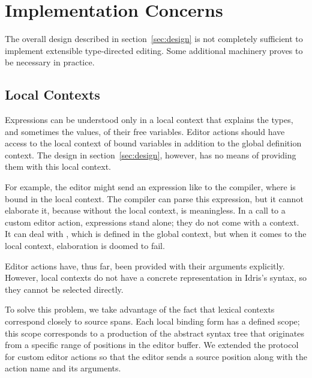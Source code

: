 \section{Implementation Concerns}\label{sec:implementation}


The overall design described in section~\ref{sec:design} is not
completely sufficient to implement extensible type-directed
editing. Some additional machinery proves to be necessary in practice.

\subsection{Local Contexts}
\label{ssec:localContext}

Expressions can be understood only in a local context that
explains the types, and sometimes the values, of their free
variables. Editor actions should have access to the local context of
bound variables in addition to the global definition context. The
design in section~\ref{sec:design}, however, has no means of providing
them with this local context.

For example, the editor might send an expression like  to the compiler, where  is bound in the local context.
The compiler can parse this expression, but it cannot elaborate it,
because without the local context,  is meaningless. In a call to
a custom editor action, expressions stand alone; they do not come with
a context. It can deal with , which is defined in the global
context, but when it comes to the local context, elaboration is doomed
to fail.

Editor actions have, thus far, been provided with their arguments
explicitly. However, local contexts do not have a concrete
representation in Idris's syntax, so they cannot be selected directly.

To solve this problem, we take advantage of the fact that lexical
contexts correspond closely to source spans. Each local binding form
has a defined scope; this scope corresponds to a production of the
abstract syntax tree that originates from a specific range of
positions in the editor buffer. We extended the protocol for custom
editor actions so that the editor sends a source position along with
the action name and its arguments.

